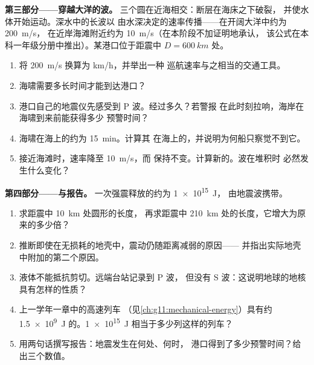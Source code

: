 \begin{problem}
\medskip
\noindent\textbf{第三部分——穿越大洋的波。}
三个圆在近海相交：断层在海床之下破裂，
并使水体开始运动。深水中的长波以
由水深决定的速率传播——在开阔大洋中约为 \qty{200}{m/s}，
在近岸海滩附近约为 \qty{10}{m/s}（在本阶段不加证明地承认，
该公式在本科一年级分册中推出）。某港口位于距震中
$D = \qty{600}{km}$ 处。
\begin{enumerate}[resume]
  \item 将 \qty{200}{m/s} 换算为 \unit{km/h}，并举出一种
        巡航速率与之相当的交通工具。
  \item 海啸需要多长时间才能到达港口？
  \item 港口自己的地震仪先感受到 P 波。经过多久？若警报
        在此时刻拉响，海岸在海啸到来前能获得多少
        预警时间？
  \item 海啸在海上的约为 \qty{15}{min}。计算其
        在海上的，并说明为何船只察觉不到它。
  \item 接近海滩时，速率降至 \qty{10}{m/s}，而
        保持不变。计算新的。波在堆积时
        必然发生什么变化？
\end{enumerate}

\medskip
\noindent\textbf{第四部分——与报告。}
一次强震释放的约为 \qty{1e15}{J}，
由地震波携带。
\begin{enumerate}[resume]
  \item 求距震中 \qty{10}{km} 处圆形的长度，
        再求距震中 \qty{210}{km} 处的长度，它增大为原来的多少倍？
  \item 推断即使在无损耗的地壳中，震动仍随距离减弱的原因——
        并指出实际地壳中附加的第二个原因。
  \item 液体不能抵抗剪切。远端台站记录到 P 波，
        但没有 S 波：这说明地球的地核具有怎样的性质？
  \item 上一学年一章中的高速列车
        （见\cref{ch:g11:mechanical-energy}）具有约 \qty{1.5e9}{J}
        的。\qty{1e15}{J} 相当于多少列这样的列车？
  \item 用两句话撰写报告：地震发生在何处、何时，
        港口得到了多少预警时间？给出三个数值。
\end{enumerate}
\end{problem}

